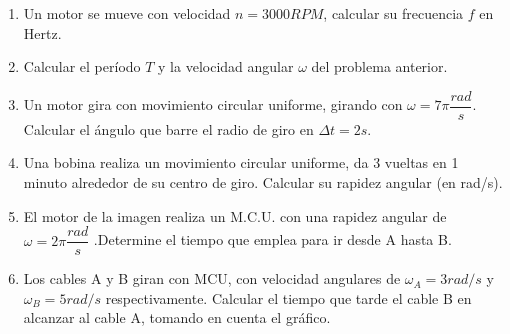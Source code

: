 \documentclass[../main]{subfiles}
\begin{document}
\begin{enumerate}
    \item Un motor se mueve con velocidad $n=3000 RPM$, calcular su frecuencia $f$ en Hertz.
    \item Calcular el período $T$ y la velocidad angular $\omega$ del problema anterior.
    \item Un motor gira con movimiento circular uniforme, girando con $\omega=7\pi \dfrac{rad}{s}$. Calcular el ángulo que barre el radio de giro en $\Delta t=2s$. 
        \item Una bobina realiza un movimiento circular uniforme, da 3 vueltas en 1 minuto alrededor de su centro de giro. Calcular su rapidez angular (en rad/s).

    \item El motor de la imagen realiza un M.C.U. con
una rapidez angular de $\omega=2\pi \dfrac{rad}{s}$ .Determine el
tiempo que emplea para ir desde A hasta B. 
    \begin{center}
    \end{center}
\item Los cables A y B giran con MCU, con velocidad angulares de $\omega_A=3rad/s$ y $\omega_B=5rad/s$ respectivamente. Calcular el tiempo que tarde el cable B en alcanzar al cable A, tomando en cuenta el gráfico. 
    \begin{center}
    \end{center}


    
\end{enumerate}
\end{document}
